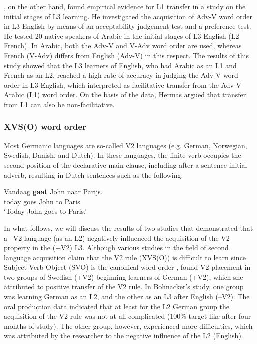 \documentclass[output=paper,modfonts,nonflat, newtxmath]{langsci/langscibook}
\begin{document}
  \citet{Hermas2010}, on the other hand, found empirical evidence for L1 transfer in a study on the initial stages of L3 learning. He investigated the acquisition of Adv-V word order in L3 English by means of an acceptability judgement test and a preference test. He tested 20 native speakers of Arabic in the initial stages of L3 English (L2 French). In Arabic, both the Adv-V and V-Adv word order are used, whereas French (V-Adv) differs from English (Adv-V) in this respect. The results of this study showed that the L3 learners of English, who had Arabic as an L1 and French as an L2, reached a high rate of accuracy in judging the Adv-V word order in L3 English, which \citet{Hermas2010} interpreted as facilitative transfer from the Adv-V Arabic (L1) word order. On the basis of the data, Hermas argued that transfer from L1 can also be non-facilitative.

\subsubsection{{XVS(O)} {word} {order}}

Most Germanic languages are so-called V2 languages (e.g. German, Norwegian, Swedish, Danish, and Dutch). In these languages, the finite verb occupies the second position of the declarative main clause, including after a sentence initial adverb, resulting in Dutch sentences such as the following:

\ea%
\label{ex:stadt:1}
\gll Vandaag \textbf{gaat} John naar Parijs.\\
today goes John to Paris\\
\glt ‘Today John goes to Paris.’
\z


In what follows, we will discuss the results of two studies that demonstrated that a –V2 language (as an L2) negatively influenced the acquisition of the V2 property in the (+V2) L3. Although various studies in the field of second language acquisition claim that the V2 rule (XVS(O)) is difficult to learn since Subject-Verb-Object (SVO) is the canonical word order \citep{KleinPerdue1997, Pienemann1998, WahlstromMcKay2001, Bohnacker2006}, \citet{Bohnacker2006} found V2 placement in two groups of Swedish (+V2) beginning learners of German (+V2), which she attributed to positive transfer of the V2 rule. In Bohnacker’s study, one group was learning German as an L2, and the other as an L3 after English (–V2). The oral production data indicated that at least for the L2 German group the acquisition of the V2 rule was not at all complicated (100\% target-like after four months of study). The other group, however, experienced more difficulties, which was attributed by the researcher to the negative influence of the L2 (English).
\end{document}
